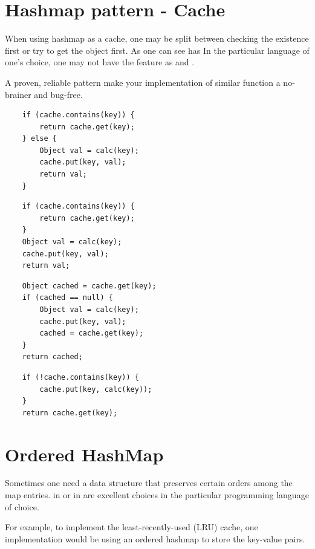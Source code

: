 
\section{Hashmap pattern - Cache}\label{sec:hashmappattern-cache}

When using hashmap as a cache, one may be split between checking the existence first or try to
get the object first.
As one can see \java has
In the particular language of one's choice, one may not have the feature as \java and \python.


A proven, reliable pattern make your implementation of similar function a no-brainer and bug-free.

\begin{lstlisting}
    if (cache.contains(key)) {
        return cache.get(key);
    } else {
        Object val = calc(key);
        cache.put(key, val);
        return val;
    }
\end{lstlisting}

\begin{lstlisting}
    if (cache.contains(key)) {
        return cache.get(key);
    }
    Object val = calc(key);
    cache.put(key, val);
    return val;
\end{lstlisting}

\begin{lstlisting}
    Object cached = cache.get(key);
    if (cached == null) {
        Object val = calc(key);
        cache.put(key, val);
        cached = cache.get(key);
    }
    return cached;
\end{lstlisting}

\begin{lstlisting}
    if (!cache.contains(key)) {
        cache.put(key, calc(key));
    }
    return cache.get(key);
\end{lstlisting}

\section{Ordered HashMap}
Sometimes one need a data structure that preserves certain orders among the map entries.
 in \python or  in \java are excellent choices in the
particular programming language of choice.

For example, to implement the least-recently-used (LRU) cache, one implementation would be using
an ordered hashmap to store the key-value pairs.
